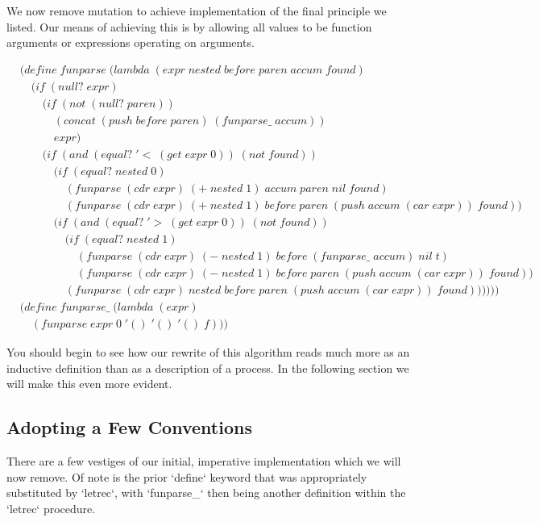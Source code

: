 We now remove mutation to achieve implementation of the final principle we listed. Our 
means of achieving this is by allowing all values to be function arguments or expressions 
operating on arguments.

\begin{align*}
& (define \; funparse \; (lambda \; (expr \; nested \; before \; paren \; accum \; found) \; 
\\& \quad (if \; (null? \; expr)
\\& \qquad (if \; (not \; (null? \; paren))
\\& \qquad \quad (concat \; (push \; before \; paren) \; (funparse\_ \; accum))
\\& \qquad \quad expr)
\\& \qquad (if \; (and \; (equal? \; '< \; (get \; expr \; 0)) \; (not \; found))
\\& \qquad \quad (if \; (equal? \; nested \; 0)
\\& \qquad \qquad (funparse \; (cdr \; expr) \; (+ \; nested \; 1) \; accum \; paren \; nil \; found)
\\& \qquad \qquad (funparse \; (cdr \; expr) \; (+ \; nested \; 1) \; before \; paren \; (push \; accum \; (car \; expr)) \; found))
\\& \qquad \quad (if \; (and \; (equal? \; '> \; (get \; expr \; 0)) \; (not \; found))
\\& \qquad \qquad (if \; (equal? \; nested \; 1)
\\& \qquad \qquad \quad (funparse \; (cdr \; expr) \; (- \; nested \; 1) \; before \; (funparse\_ \; accum) \; nil \; t)
\\& \qquad \qquad \quad (funparse \; (cdr \; expr) \; (- \; nested \; 1) \; before \; paren \; (push \; accum \; (car \; expr)) \; found))
\\& \qquad \qquad (funparse \; (cdr \; expr) \; nested \; before \; paren \; (push \; accum \; (car \; expr)) \; found))))))
\\& (define \; funparse\_ \; (lambda \; (expr)
\\& \quad (funparse \; expr \; 0 \; '() \; '() \; '() \; f))) \; 
\end{align*}

You should begin to see how our rewrite of this algorithm reads much more as an inductive 
definition than as a description of a process. In the following section we will make this 
even more evident.

\subsection{Adopting a Few Conventions}
There are a few vestiges of our initial, imperative implementation which we will now remove. 
Of note is the prior `define` keyword that was appropriately substituted by `letrec`, with 
`funparse\_` then being another definition within the `letrec` procedure.

